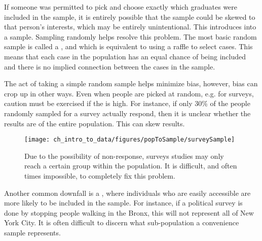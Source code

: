 If someone was permitted to pick and choose exactly which graduates were included in the sample, it is entirely possible that the sample could be skewed to that person's interests, which may be entirely unintentional. This introduces  into a sample. Sampling randomly helps resolve this problem. The most basic random sample is called a , and which is equivalent to using a raffle to select cases. This means that each case in the population has an equal chance of being included and there is no implied connection between the cases in the sample.


The act of taking a simple random sample helps minimize bias, however, bias can crop up in other ways.
Even when people are picked at random, e.g. for surveys, caution must be exercised if the   is high. For instance, if only 30\% of the people randomly sampled for a survey actually respond, then it is unclear whether the results are  of the entire population. This   can skew results.

\begin{figure}[h]
\centering
\texttt{[image: ch\_intro\_to\_data/figures/popToSample/surveySample]}
\caption{Due to the possibility of non-response, surveys studies may only reach a certain group within the population. It is difficult, and often times impossible, to completely fix this problem.}
\label{surveySample}
\end{figure}

Another common downfall is a , where individuals who are easily accessible are more likely to be included in the sample. For instance, if a political survey is done by stopping people walking in the Bronx, this will not represent all of New York City. It is often difficult to discern what sub-population a convenience sample represents.

